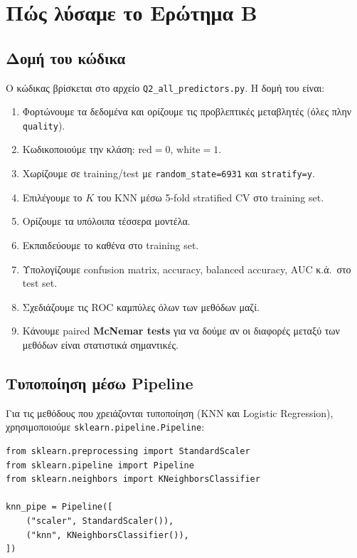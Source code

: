 \documentclass[11pt,a4paper]{article}
\newcommand{\code}[1]{\texttt{#1}}
\begin{document}
\section{Πώς λύσαμε το Ερώτημα Β}

\subsection{Δομή του κώδικα}

Ο κώδικας βρίσκεται στο αρχείο \code{Q2\_all\_predictors.py}. Η δομή του
είναι:
\begin{enumerate}
    \item Φορτώνουμε τα δεδομένα και ορίζουμε τις προβλεπτικές μεταβλητές
    (όλες πλην \code{quality}).
    \item Κωδικοποιούμε την κλάση: \(\text{red}=0\), \(\text{white}=1\).
    \item Χωρίζουμε σε training/test με \code{random\_state=6931} και
    \code{stratify=y}.
    \item Επιλέγουμε το \(K\) του KNN μέσω 5-fold stratified CV στο
    training set.
    \item Ορίζουμε τα υπόλοιπα τέσσερα μοντέλα.
    \item Εκπαιδεύουμε το καθένα στο training set.
    \item Υπολογίζουμε confusion matrix, accuracy, balanced accuracy,
    AUC κ.ά.\ στο test set.
    \item Σχεδιάζουμε τις ROC καμπύλες όλων των μεθόδων μαζί.
    \item Κάνουμε paired \textbf{McNemar tests} για να δούμε αν οι
    διαφορές μεταξύ των μεθόδων είναι στατιστικά σημαντικές.
\end{enumerate}

\subsection{Τυποποίηση μέσω Pipeline}

Για τις μεθόδους που χρειάζονται τυποποίηση (KNN και Logistic
Regression), χρησιμοποιούμε \code{sklearn.pipeline.Pipeline}:
\begin{lstlisting}
from sklearn.preprocessing import StandardScaler
from sklearn.pipeline import Pipeline
from sklearn.neighbors import KNeighborsClassifier

knn_pipe = Pipeline([
    ("scaler", StandardScaler()),
    ("knn", KNeighborsClassifier()),
])
\end{lstlisting}
\end{document}
